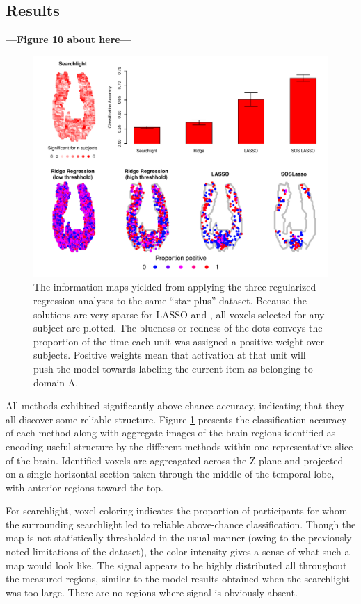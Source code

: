 \subsection{Results}
\textbf{---Figure 10 about here---}
\begin{figure}
\centering
\includegraphics[width=.9\textwidth]{figures/cmu_all_results.eps}
\caption{\label{fig.brain}  The information maps yielded from applying the three regularized regression analyses to the same ``star-plus'' dataset. Because the solutions are very sparse for LASSO and \soslasso, all voxels selected for any subject are plotted. The blueness or redness of the dots conveys the proportion of the time each unit was assigned a positive weight over subjects. Positive weights mean that activation at that unit will push the model towards labeling the current item as belonging to domain A.}
\end{figure}

All methods exhibited significantly above-chance accuracy, indicating that they all discover some reliable structure. Figure \ref{fig.brain} presents the classification accuracy of each method along with aggregate images of the brain regions identified as encoding useful structure by the different methods within one representative slice of the brain.  Identified voxels are aggreagated across the Z plane and projected on a single horizontal section taken through the middle of the temporal lobe, with anterior regions toward the top. 

For searchlight, voxel coloring indicates the proportion of participants for whom the surrounding searchlight led to reliable above-chance classification. Though the map is not statistically thresholded in the usual manner (owing to the previously-noted limitations of the dataset), the color intensity gives a sense of what such a map would look like. The signal appears to be highly distributed all throughout the measured regions, similar to the model results obtained when the searchlight was too large. There are no regions where signal is obviously absent. 

